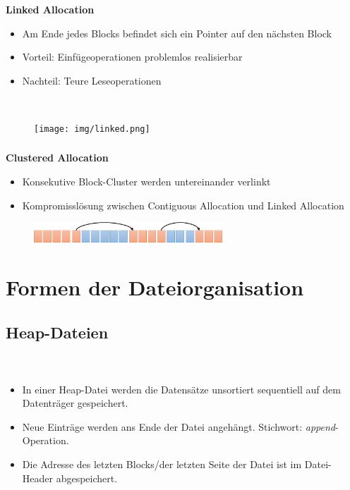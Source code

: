\begin{frame}
\frametitle{\insertsection}
\framesubtitle{\insertsubsection}
\abs
\textbf{Linked Allocation}
	\begin{itemize}
		\item Am Ende jedes Blocks befindet sich ein Pointer auf den n\"achsten Block
		\item Vorteil: Einf\"ugeoperationen problemlos realisierbar
		\item Nachteil: Teure Leseoperationen
	\end{itemize}\ \\[4pt]
\begin{figure}
	\texttt{[image: img/linked.png]}
\end{figure}
\end{frame}

\begin{frame}
\frametitle{\insertsection}
\framesubtitle{\insertsubsection}
\abs
\textbf{Clustered Allocation}
	\begin{itemize}
		\item Konsekutive Block-Cluster werden untereinander verlinkt
		\item Kompromissl\"osung zwischen Contiguous Allocation und Linked Allocation
	\end{itemize}
\begin{figure}
	\includegraphics[width=200pt]{img/clustered.png}
\end{figure}
\end{frame}

\section{Formen der Dateiorganisation}
\subsection{Heap-Dateien}

\begin{frame}
	\frametitle{\insertsection}
	\framesubtitle{\insertsubsection}
	\\[4pt]
	\begin{itemize}
		\item In einer Heap-Datei werden die Datens\"atze unsortiert sequentiell auf dem Datenträger gespeichert.\\[4pt]
		\item Neue Einträge werden ans Ende der Datei angeh\"angt. Stichwort: \textit{append}-Operation.\\[4pt]
		\item Die Adresse des letzten Blocks/der letzten Seite der Datei ist im Datei-Header abgespeichert.
	\end{itemize}	
\end{frame}

